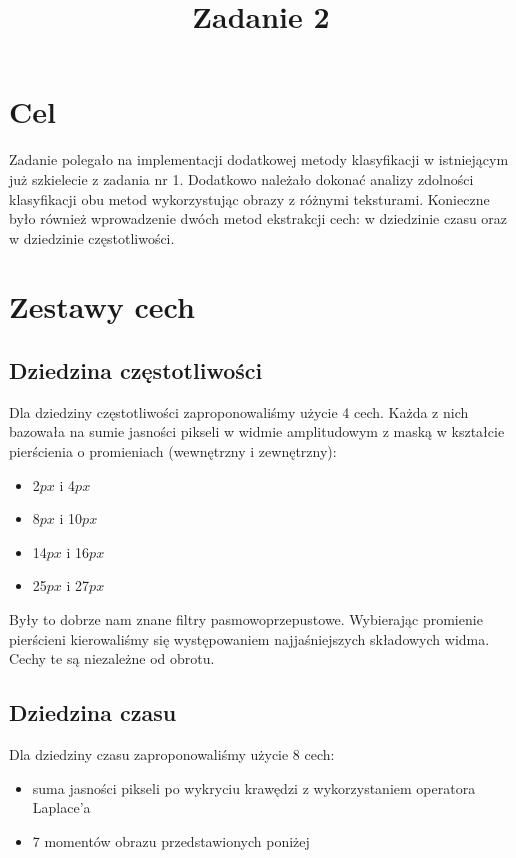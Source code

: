 \documentclass{classrep}
\author{
  \studentinfo{Hubert Marcinkowski}{214942} \and
  \studentinfo{Artur Wróblewski}{214985}
}
\title{Zadanie 2}
\begin{document}
\maketitle


\section{Cel}
Zadanie polegało na implementacji dodatkowej metody klasyfikacji w istniejącym już szkielecie z zadania nr 1. Dodatkowo należało dokonać analizy zdolności klasyfikacji obu metod wykorzystując obrazy z różnymi teksturami. Konieczne było również wprowadzenie dwóch metod ekstrakcji cech: w dziedzinie czasu oraz w dziedzinie częstotliwości.


\section{Zestawy cech}

\subsection{Dziedzina częstotliwości}

Dla dziedziny częstotliwości zaproponowaliśmy użycie 4 cech. Każda z nich bazowała na sumie jasności pikseli w widmie amplitudowym z maską w kształcie pierścienia o promieniach (wewnętrzny i zewnętrzny):
\begin{itemize}
\item 2$px$ i 4$px$
\item 8$px$ i 10$px$
\item 14$px$ i 16$px$
\item 25$px$ i 27$px$
\end{itemize}

Były to dobrze nam znane filtry pasmowoprzepustowe. Wybierając promienie pierścieni kierowaliśmy się występowaniem najjaśniejszych składowych widma. Cechy te są niezależne od obrotu.

\subsection{Dziedzina czasu}

Dla dziedziny czasu zaproponowaliśmy użycie 8 cech:

\begin{itemize}
\item suma jasności pikseli po wykryciu krawędzi z wykorzystaniem operatora Laplace'a
\item 7 momentów obrazu przedstawionych poniżej
\end{itemize}
\end{document}
